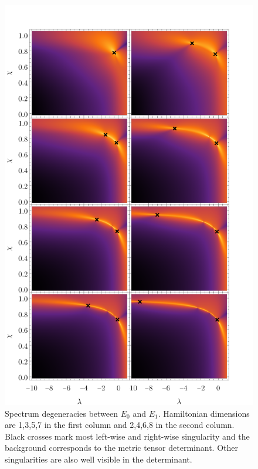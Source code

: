\begin{figure}[H]
    \centering
    \includegraphics[scale=1.3]{../img/singularitiesPlots.pdf}
    \caption{Spectrum degeneracies between $E_0$ and $E_1$. Hamiltonian dimensions are 1,3,5,7 in the first column and 2,4,6,8 in the second column. Black crosses mark most left-wise and right-wise singularity and the background corresponds to the metric tensor determinant. Other singularities are also well visible in the determinant.}
    \label{fig:singularities3to10}    
\end{figure}









